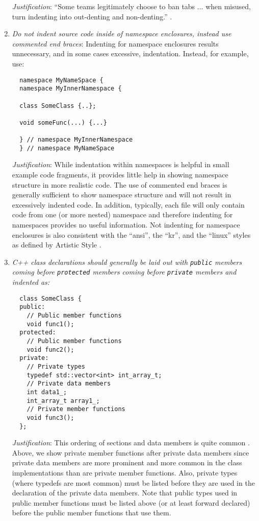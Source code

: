 \begin{enumerate}
{}\textit{Justification}: ``Some teams legitimately choose to ban tabs
... when misused, turn indenting into out-denting and non-denting.''
{}\cite[Item 0]{C++CodingStandards05}.

{}\item\textit{Do not indent source code inside of namespace enclosures,
instead use commented end braces}: Indenting for namespace enclosures results
unnecessary, and in some cases excessive, indentation.  Instead, for example,
use:

{\small\begin{verbatim}
  namespace MyNameSpace {
  namespace MyInnerNamespace {

  class SomeClass {..};

  void someFunc(...) {...}

  } // namespace MyInnerNamespace
  } // namespace MyNameSpace
\end{verbatim}}

{}\textit{Justification}: While indentation within namespaces is helpful in
small example code fragments, it provides little help in showing namespace
structure in more realistic code.  The use of commented end braces is
generally sufficient to show namespace structure and will not result in
excessively indented code.  In addition, typically, each file will only
contain code from one (or more nested) namespace and therefore indenting for
namespaces provides no useful information.  Not indenting for namespace
enclosures is also consistent with the ``ansi'', the ``kr'', and the ``linux''
styles as defined by Artistic Style {}\cite{ArtisticStyle}.

{}\item\textit{C++ class declarations should generally be laid out with
{}\texttt{public} members coming before {}\texttt{protected} members coming
before {}\texttt{private} members and indented as:}

{\small\begin{verbatim}
  class SomeClass {
  public:
    // Public member functions
    void func1();
  protected:
    // Public member functions
    void func2();
  private:
    // Private types
    typedef std::vector<int> int_array_t;
    // Private data members
    int data1_;
    int_array_t array1_;
    // Private member functions
    void func3();
  };
\end{verbatim}}

{}\textit{Justification}: This ordering of sections and data members is quite
common {}\cite[Section 31.8]{CodeComplete2nd04}.  Above, we show private
member functions after private data members since private data members are
more prominent and more common in the class implementations than are private
member functions.  Also, private types (where typedefs are most common) must
be listed before they are used in the declaration of the private data members.
Note that public types used in public member functions must be listed above
(or at least forward declared) before the public member functions that use
them.


\end{enumerate}
